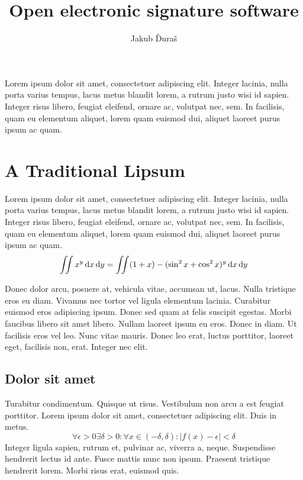 \documentclass[thesismargins, english, thesislinespacing, twoside, openright, upjsfrontpage]{rnthesis}
\title{Open electronic signature software}
\author{Jakub Ďuraš}
\begin{document}
\maketitle
\newpage
\tableofcontents
\listoffigures
\listoftables

\uvod

Lorem ipsum dolor sit amet, consectetuer adipiscing elit.
Integer lacinia, nulla porta varius tempus, lacus metus blandit
lorem, a rutrum justo wisi id sapien. Integer risus libero,
feugiat eleifend, ornare ac, volutpat nec, sem. In facilisis,
quam eu elementum aliquet, lorem quam euismod dui, aliquet
laoreet purus ipsum ac quam. 


\chapter{A Traditional Lipsum}

Lorem ipsum dolor sit amet, consectetuer adipiscing elit.
Integer lacinia, nulla porta varius tempus, lacus metus blandit
lorem, a rutrum justo wisi id sapien. Integer risus libero,
feugiat eleifend, ornare ac, volutpat nec, sem. In facilisis,
quam eu elementum aliquet, lorem quam euismod dui, aliquet
laoreet purus ipsum ac quam. 
%
$$\int\!\!\!\int x^y\,{\rm d}x\,{\rm d}y = \int\!\!\!\int (1 + x) - (\sin^2 x + \cos^2 x)^y\,{\rm d}x\,{\rm d}y$$

Donec dolor arcu, posuere at, vehicula vitae, accumsan ut,
lacus. Nulla tristique eros eu diam. Vivamus nec tortor vel
ligula elementum lacinia. Curabitur euismod eros adipiscing
ipsum. Donec sed quam at felis suscipit egestas. Morbi faucibus
libero sit amet libero. Nullam laoreet ipsum eu eros. Donec in
diam. Ut facilisis eros vel leo. Nunc vitae mauris. Donec leo
erat, luctus porttitor, laoreet eget, facilisis non, erat.
Integer nec elit.

\section{Dolor sit amet}

Turabitur condimentum. Quisque ut risus. Vestibulum non arcu a
est feugiat porttitor. Lorem ipsum dolor sit amet, consectetuer
adipiscing elit. Duis in metus. 
%
$$\forall \epsilon>0 \exists \delta>0:\forall x\in(-\delta,\delta):|f(x)-\epsilon|<\delta$$
%
Integer ligula sapien, rutrum et, pulvinar ac, viverra a,
neque. Suspendisse hendrerit lectus id ante. Fusce mattis nunc
non ipsum. Praesent tristique hendrerit lorem. Morbi risus
erat, euismod quis.
\end{document}
